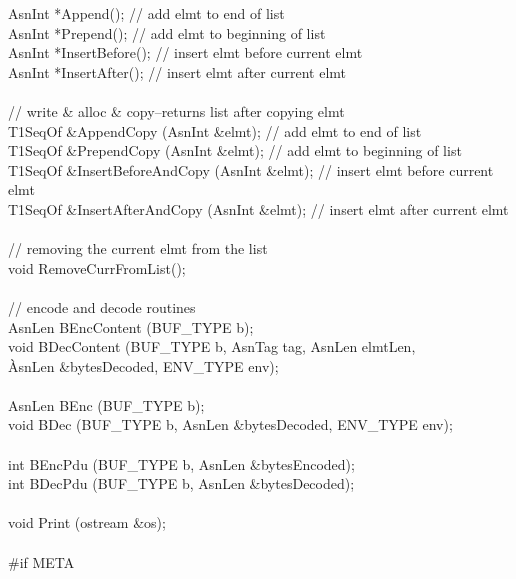 \begin{Ccode}
    AsnInt               \>\>*Append();  // add elmt to end of list\\
    AsnInt               \>\>*Prepend(); // add elmt to beginning of list\\
    AsnInt               \>\>*InsertBefore(); // insert elmt before current elmt\\
    AsnInt               \>\>*InsertAfter();  // insert elmt after current elmt\\
\\
    // write \& alloc \& copy--returns list after copying elmt\\
    T1SeqOf              \>\>\&AppendCopy (AsnInt \&elmt);  // add elmt to end of list\\
    T1SeqOf              \>\>\&PrependCopy (AsnInt \&elmt); // add elmt to beginning of list\\
    T1SeqOf              \>\>\&InsertBeforeAndCopy (AsnInt \&elmt); // insert elmt before current elmt\\
    T1SeqOf              \>\>\&InsertAfterAndCopy (AsnInt \&elmt); // insert elmt after current elmt\\
\\
    // removing the current elmt from the list\\
    void                 \>\>RemoveCurrFromList();\\
\\
    // encode and decode routines\\
    AsnLen               \>\>BEncContent (BUF\_TYPE b);\\
    void                 \>\>BDecContent (BUF\_TYPE b, AsnTag tag, AsnLen elmtLen,\\
                         \` AsnLen \&bytesDecoded, ENV\_TYPE env);\\
\\
    AsnLen               \>\>BEnc (BUF\_TYPE b);\\
    void                 \>\>BDec (BUF\_TYPE b, AsnLen \&bytesDecoded, ENV\_TYPE env);\\
\\
    int                  \>\>BEncPdu (BUF\_TYPE b, AsnLen \&bytesEncoded);\\
    int                  \>\>BDecPdu (BUF\_TYPE b, AsnLen \&bytesDecoded);\\
\\
    void                 \>\>Print (ostream \&os);\\
\\
\<\#if META\\

\end{Ccode}

